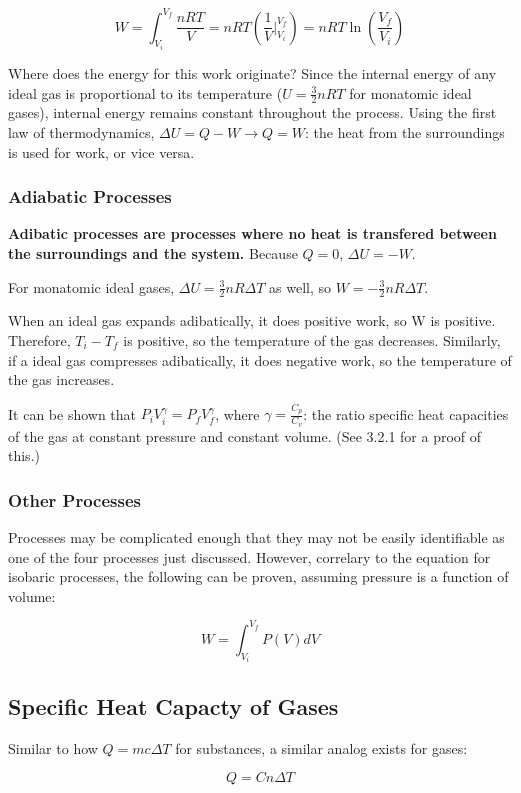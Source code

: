 \documentclass[12pt, a4paper]{article}
\theoremstyle{definition}
\begin{document}
\[W = \int_{V_i}^{V_f} \frac{nRT}{V} = nRT (\frac{1}{V}\Big|_{V_i}^{V_f}) = nRT\ln(\frac{V_f}{V_i})\]

Where does the energy for this work originate?
Since the internal energy of any ideal gas is proportional to its temperature ($U = \frac{3}{2}nRT$ for monatomic ideal gases), internal energy remains constant throughout the process.
Using the first law of thermodynamics, $\Delta U = Q - W \rightarrow Q = W$: the heat from the surroundings is used for work, or vice versa.

\subsubsection{Adiabatic Processes}
\textbf{Adibatic processes are processes where no heat is transfered between the surroundings and the system.}
Because $Q = 0$, $\Delta U = -W$.

For monatomic ideal gases, $\Delta U = \frac{3}{2}nR \Delta T$ as well, so $W = -\frac{3}{2}nR \Delta T$.

When an ideal gas expands adibatically, it does positive work, so W is positive.
Therefore, $T_i - T_f$ is positive, so the temperature of the gas decreases.
Similarly, if a ideal gas compresses adibatically, it does negative work, so the temperature of the gas increases.

It can be shown that $P_i V_i^\gamma = P_f V_f^\gamma$, where $\gamma = \frac{C_p}{C_v}$: the ratio specific heat capacities of the gas at constant pressure and constant volume.
(See 3.2.1 for a proof of this.)

\subsubsection{Other Processes}
Processes may be complicated enough that they may not be easily identifiable as one of the four processes just discussed.
However, correlary to the equation for isobaric processes, the following can be proven, assuming pressure is a function of volume:

\[W = \int_{V_i}^{V_f} P(V)dV\]

\subsection{Specific Heat Capacty of Gases}
Similar to how $Q = mc \Delta T$ for substances, a similar analog exists for gases:

\[Q = Cn\Delta T\]
\end{document}
